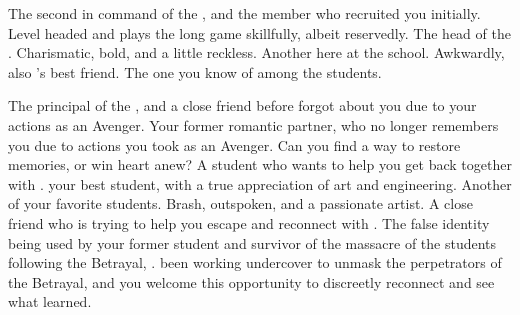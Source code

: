 \documentclass[char]{GL2020}
\begin{document}
\begin{contacts}
    \contact{\cChupSecond{}} The second in command of the \pGoaties{}, and the member who recruited you initially. Level headed and plays the long game skillfully, albeit reservedly.
    \contact{\cChupLeader{}} The head of the \pGoaties{}. Charismatic, bold, and a little reckless.
    \contact{\cChupInventor{}} Another \pGoatie{} here at the school. Awkwardly, also \cHeadScientist{}’s best friend.
    \contact{\cChupStudent{}} The one \pGoatie{} you know of among the students.
\end{contacts}

\begin{contacts}
    \contact{\cPrincipal{}} The principal of the \pSchool{}, and a close friend before \cPrincipal{\they} forgot about you due to your actions as an Avenger. 
    \contact{\cHeadScientist{}} Your former romantic partner, who no longer remembers you due to actions you took as an Avenger. Can you find a way to restore \cHeadScientist{\their} memories, or win \cHeadScientist{\their} heart anew?
    \contact{\cInitiate{}} A \pShippie{} student who wants to help you get back together with \cHeadScientist{}. \cInitiate{\Theyare} your best student, with a true appreciation of art and engineering.
    \contact{\cPirateChild{}} Another of your favorite students. Brash, outspoken, and a passionate artist. 
    \contact{\cLibrarian{}} A close friend who is trying to help you escape \cGenesis{} and reconnect with \cHeadScientist{}. 
    \contact{\cAssistantScientist{\full}} The false identity being used by your former student and survivor of the massacre of the students following the Betrayal, \cKidScientist{\full}. \cAssistantScientist{\Theyhave} been working undercover to unmask the perpetrators of the Betrayal, and you welcome this opportunity to discreetly reconnect and see what \cAssistantScientist{\theyhave} learned.
\end{contacts}
\end{document}
